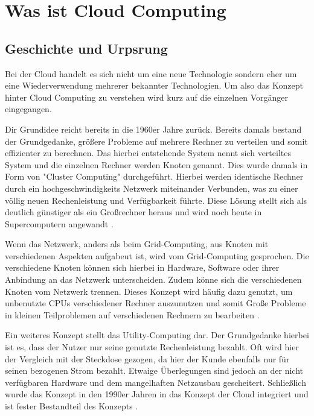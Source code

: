 \chapter{Was ist \Gls{Cloud Computing}}\label{ch:2}
\section{Geschichte und Urpsrung}
Bei der Cloud handelt es sich nicht um eine neue Technologie sondern eher um eine Wiederverwendung mehrerer bekannter Technologien. Um also das Konzept hinter Cloud Computing zu verstehen wird kurz auf die einzelnen Vorgänger eingegangen.

Dir Grundidee reicht bereits in die 1960er Jahre zurück. Bereits damals bestand der Grundgedanke, größere Probleme auf mehrere Rechner zu verteilen und somit effizienter zu berechnen. Das hierbei entstehende System nennt sich verteiltes System und die einzelnen Rechner werden Knoten genannt. Dies wurde damals in Form von "Cluster Computing" durchgeführt. Hierbei werden identische Rechner durch ein hochgeschwindigkeits Netzwerk miteinander Verbunden, was zu einer völlig neuen Rechenleistung und Verfügbarkeit führte. Diese Lösung stellt sich als deutlich günstiger als ein Großrechner heraus und wird noch heute in Supercomputern angewandt \cite*[]{DAAS}.

Wenn das Netzwerk, anders als beim Grid-Computing, aus Knoten mit verschiedenen Aspekten aufgabeut ist, wird vom Grid-Computing gesprochen. Die verschiedene Knoten können sich hierbei in Hardware, Software oder ihrer Anbindung an das Netzwerk unterscheiden. Zudem könne sich die verschiedenen Knoten vom Netzwerk trennen. Dieses Konzept wird häufig dazu genutzt, um unbenutzte CPUs verschiedener Rechner auszunutzen und somit Große Probleme in kleinen Teilproblemen auf verschiedenen Rechnern zu bearbeiten \cite*[]{DAAS}.

Ein weiteres Konzept stellt das Utility-Computing dar. Der Grundgedanke hierbei ist es, dass der Nutzer nur seine genutzte Rechenleistung bezahlt. Oft wird hier der Vergleich mit der Steckdose gezogen, da hier der Kunde ebenfalls nur für seinen bezogenen Strom bezahlt\cite*[]{TUB}. Etwaige Überlegungen sind jedoch an der nicht verfügbaren Hardware und dem mangelhaften Netzausbau gescheitert. Schließlich wurde das Konzept in den 1990er Jahren in das Konzept der Cloud integriert und ist fester Bestandteil des Konzepts \cite*[]{DAAS}. 


